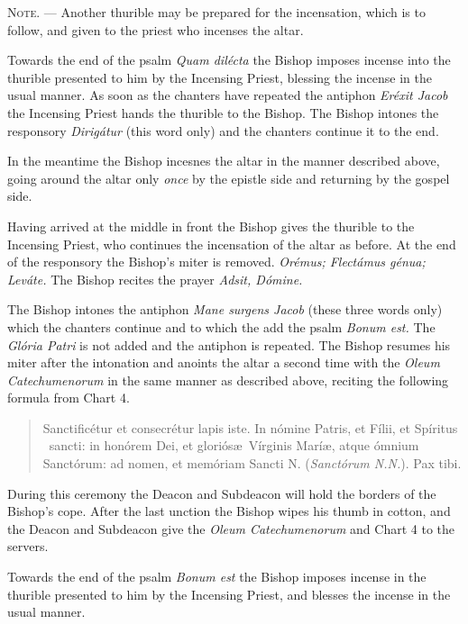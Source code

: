 \documentclass[letterpaper]{report}
\begin{document}
{    \textsc{Note. ---} Another thurible may be prepared for the incensation,
    which is to follow, and given to the priest who incenses the altar.

    \rubric Towards the end of the psalm \textit{Quam dil\'ecta} the Bishop
    imposes incense into the thurible presented to him by the Incensing Priest,
    blessing the incense in the usual manner. As soon as the chanters have
    repeated the antiphon \textit{Er\'exit Jacob} the Incensing Priest hands
    the thurible to the Bishop. The Bishop intones the responsory
    \textit{Dirig\'atur} (this word only) and the chanters continue it to the
    end.

    In the meantime the Bishop incesnes the altar in the manner described
    above, going around the altar only \textit{once} by the epistle side and
    returning by the gospel side.

    \rubric Having arrived at the middle in front the Bishop gives the thurible
    to the Incensing Priest, who continues the incensation of the altar as
    before. At the end of the responsory the Bishop's miter is removed.
    \textit{Orémus; Flectámus génua; Leváte.} The Bishop recites the prayer
    \textit{Adsit, Dómine.}

    \rubric The Bishop intones the antiphon \textit{Mane surgens Jacob} (these
    three words only) which the chanters continue and to which the add the
    psalm \textit{Bonum est.} The \textit{Gl\'oria Patri} is not added and the
    antiphon is repeated. The Bishop resumes his miter after the intonation and
    anoints the altar a second time with the \textit{Oleum Catechumenorum} in
    the same manner as described above, reciting the following formula from
    Chart 4.

    \begin{quote}
        Sancti\cross ficétur et conse\cross crétur lapis iste. In nómine
        Pa\cross tris, et Fí\cross lii, et Spíritus \cross\ sancti: in honórem
        Dei, et gloriós\ae\ Vírginis Marí\ae, atque ómnium Sanctórum: ad nomen,
        et memóriam Sancti N. (\textit{Sanctórum N.N.}). Pax tibi.
    \end{quote}

    During this ceremony the Deacon and Subdeacon will hold the borders of the
    Bishop's cope. After the last unction the Bishop wipes his thumb in cotton, and
    the Deacon and Subdeacon give the \textit{Oleum Catechumenorum} and Chart 4 to
    the servers.

    \rubric Towards the end of the psalm \textit{Bonum est} the Bishop imposes
    incense in the thurible presented to him by the Incensing Priest, and
    blesses the incense in the usual manner.

}
\end{document}
